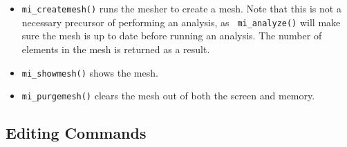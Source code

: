 \begin{itemize}
\item{\tt mi\_createmesh()} runs the mesher to create a mesh. Note that this is not a
necessary precursor of performing an analysis, as {\tt
mi\_analyze()} will make sure the mesh is up to date before running
an analysis. The number of elements in the mesh is returned as a result.

\item{\tt mi\_showmesh()} shows the mesh.

\item{\tt mi\_purgemesh()} clears the mesh out of both the screen and
memory.
\end{itemize}

\subsection{Editing Commands}

